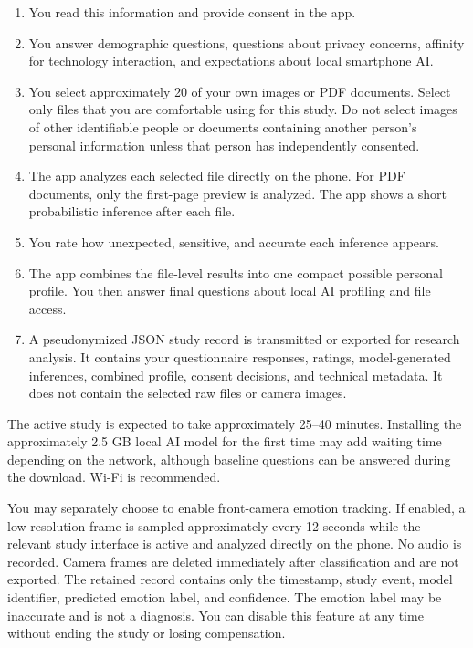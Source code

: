 \documentclass[10pt,a4paper]{article}
\begin{document}
\begin{enumerate}
  \item You read this information and provide consent in the app.
  \item You answer demographic questions, questions about privacy concerns, affinity for technology interaction, and expectations about local smartphone AI.
  \item You select approximately 20 of your own images or PDF documents. Select only files that you are comfortable using for this study. Do not select images of other identifiable people or documents containing another person's personal information unless that person has independently consented.
  \item The app analyzes each selected file directly on the phone. For PDF documents, only the first-page preview is analyzed. The app shows a short probabilistic inference after each file.
  \item You rate how unexpected, sensitive, and accurate each inference appears.
  \item The app combines the file-level results into one compact possible personal profile. You then answer final questions about local AI profiling and file access.
  \item A pseudonymized JSON study record is transmitted or exported for research analysis. It contains your questionnaire responses, ratings, model-generated inferences, combined profile, consent decisions, and technical metadata. It does not contain the selected raw files or camera images.
\end{enumerate}

The active study is expected to take approximately 25--40 minutes. Installing the approximately 2.5 GB local AI model for the first time may add waiting time depending on the network, although baseline questions can be answered during the download. Wi-Fi is recommended.


You may separately choose to enable front-camera emotion tracking. If enabled, a low-resolution frame is sampled approximately every 12 seconds while the relevant study interface is active and analyzed directly on the phone. No audio is recorded. Camera frames are deleted immediately after classification and are not exported. The retained record contains only the timestamp, study event, model identifier, predicted emotion label, and confidence. The emotion label may be inaccurate and is not a diagnosis. You can disable this feature at any time without ending the study or losing compensation.
\end{document}
